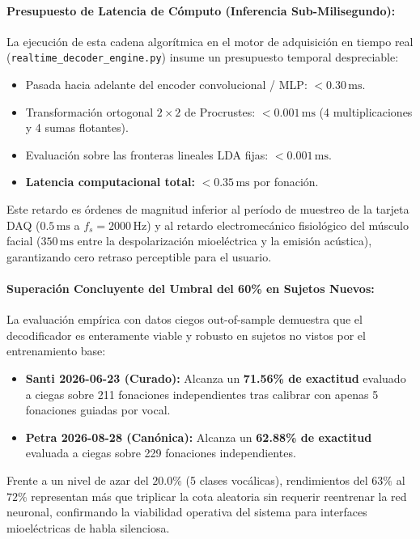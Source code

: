 \documentclass[11pt,a4paper,openany]{book}
\theoremstyle{definition}
\begin{document}
\paragraph{Presupuesto de Latencia de Cómputo (Inferencia Sub-Milisegundo):}
La ejecución de esta cadena algorítmica en el motor de adquisición en tiempo real (\texttt{realtime\_decoder\_engine.py}) insume un presupuesto temporal despreciable:
\begin{itemize}
    \item Pasada hacia adelante del encoder convolucional / MLP: $< 0.30\,\text{ms}$.
    \item Transformación ortogonal $2 \times 2$ de Procrustes: $< 0.001\,\text{ms}$ (4 multiplicaciones y 4 sumas flotantes).
    \item Evaluación sobre las fronteras lineales LDA fijas: $< 0.001\,\text{ms}$.
    \item \textbf{Latencia computacional total:} $< 0.35\,\text{ms}$ por fonación.
\end{itemize}
Este retardo es órdenes de magnitud inferior al período de muestreo de la tarjeta DAQ ($0.5\,\text{ms}$ a $f_s = 2000\,\text{Hz}$) y al retardo electromecánico fisiológico del músculo facial ($350\,\text{ms}$ entre la despolarización mioeléctrica y la emisión acústica), garantizando cero retraso perceptible para el usuario.

\paragraph{Superación Concluyente del Umbral del 60\% en Sujetos Nuevos:}
La evaluación empírica con datos ciegos out-of-sample demuestra que el decodificador es enteramente viable y robusto en sujetos no vistos por el entrenamiento base:
\begin{itemize}
    \item \textbf{Santi 2026-06-23 (Curado):} Alcanza un \textbf{71.56\% de exactitud} evaluado a ciegas sobre 211 fonaciones independientes tras calibrar con apenas 5 fonaciones guiadas por vocal.
    \item \textbf{Petra 2026-08-28 (Canónica):} Alcanza un \textbf{62.88\% de exactitud} evaluada a ciegas sobre 229 fonaciones independientes.
\end{itemize}
Frente a un nivel de azar del $20.0\%$ (5 clases vocálicas), rendimientos del $63\%$ al $72\%$ representan más que triplicar la cota aleatoria sin requerir reentrenar la red neuronal, confirmando la viabilidad operativa del sistema para interfaces mioeléctricas de habla silenciosa.
\end{document}

